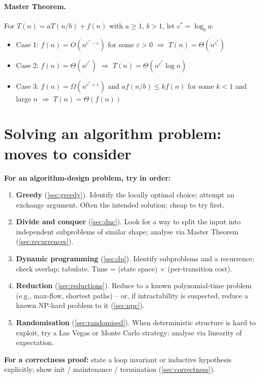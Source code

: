 \paragraph{Master Theorem.}
For $T(n) = a T(n/b) + f(n)$ with $a \ge 1$, $b > 1$, let $c^* = \log_b a$:
\begin{itemize}
  \item Case 1: $f(n) = O(n^{c^* - \varepsilon})$ for some $\varepsilon > 0$ \(\Rightarrow\) $T(n) = \Theta(n^{c^*})$
  \item Case 2: $f(n) = \Theta(n^{c^*})$ \(\Rightarrow\) $T(n) = \Theta(n^{c^*} \log n)$
  \item Case 3: $f(n) = \Omega(n^{c^* + \varepsilon})$ and $af(n/b) \le k f(n)$ for some $k < 1$ and large $n$ \(\Rightarrow\) $T(n) = \Theta(f(n))$
\end{itemize}

\section*{Solving an algorithm problem: moves to consider}
\label{sec:checklist}

\textbf{For an algorithm-design problem, try in order:}
\begin{enumerate}
  \item \textbf{Greedy} (\cref{sec:greedy}). Identify the locally optimal choice; attempt an exchange argument. Often the intended solution; cheap to try first.
  \item \textbf{Divide and conquer} (\cref{sec:dnc}). Look for a way to split the input into independent subproblems of similar shape; analyse via Master Theorem (\cref{sec:recurrences}).
  \item \textbf{Dynamic programming} (\cref{sec:dp}). Identify subproblems and a recurrence; check overlap; tabulate. Time = (state space) $\times$ (per-transition cost).
  \item \textbf{Reduction} (\cref{sec:reductions}). Reduce to a known polynomial-time problem (e.g., max-flow, shortest paths) -- or, if intractability is suspected, reduce a known NP-hard problem to it (\cref{sec:npc}).
  \item \textbf{Randomisation} (\cref{sec:randomised}). When deterministic structure is hard to exploit, try a Las Vegas or Monte Carlo strategy; analyse via linearity of expectation.
\end{enumerate}

\textbf{For a correctness proof:} state a loop invariant or inductive hypothesis explicitly; show init / maintenance / termination (\cref{sec:correctness}).

